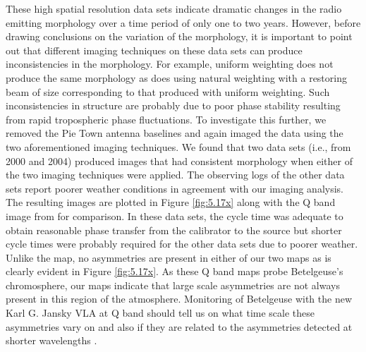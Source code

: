 These high spatial resolution data sets indicate dramatic changes in the radio emitting morphology over a time period of only one to two years. However, before drawing conclusions on the variation of the morphology, it is important to point out that different imaging techniques on these data sets can produce inconsistencies in the morphology. For example, uniform weighting does not produce the same morphology as does using natural weighting with a restoring beam of size corresponding to that produced with uniform weighting. Such inconsistencies in structure are probably due  to poor phase stability resulting from rapid tropospheric phase fluctuations. To investigate this further, we removed the Pie Town antenna baselines and again imaged the data using the two aforementioned imaging techniques. We found that two data sets (i.e., from 2000 and 2004) produced images that had consistent morphology when either of the two imaging techniques were applied. The observing logs of the other data sets report poorer weather conditions in agreement with our imaging analysis. The resulting images are plotted in Figure \ref{fig:5.17x} along with the Q band image from \cite{lim_1998} for comparison. In these data sets, the cycle time was adequate to obtain reasonable phase transfer from the calibrator to the source but shorter cycle times were probably required for the other data sets due to poorer weather. Unlike the \cite{lim_1998} map, no asymmetries are present in either of our two maps as is clearly evident in Figure \ref{fig:5.17x}. As these Q band maps probe Betelgeuse's chromosphere, our maps indicate that large scale asymmetries are not always present in this region of the atmosphere. Monitoring of Betelgeuse with the new Karl G. Jansky VLA at Q band should tell us on what time scale these asymmetries vary on and also if they are related to the asymmetries detected at shorter wavelengths \citep[e.g.,][]{chiavassa_2010, buscher_1990, wilson_1992, tuthill_1997}.

